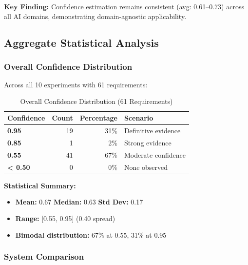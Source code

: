 \documentclass[11pt,a4paper]{article}
\begin{document}
\textbf{Key Finding:} Confidence estimation remains consistent (avg: 0.61--0.73) across all AI domains, demonstrating domain-agnostic applicability.

\subsection{Aggregate Statistical Analysis}

\subsubsection{Overall Confidence Distribution}

Across all 10 experiments with 61 requirements:

\begin{table}[H]
\centering
\caption{Overall Confidence Distribution (61 Requirements)}
\begin{tabular}{lrrl}
\toprule
\textbf{Confidence} & \textbf{Count} & \textbf{Percentage} & \textbf{Scenario} \\
\midrule
\textbf{0.95} & 19 & 31\% & Definitive evidence \\
\textbf{0.85} & 1 & 2\% & Strong evidence \\
\textbf{0.55} & 41 & 67\% & Moderate confidence \\
\textbf{< 0.50} & 0 & 0\% & None observed \\
\bottomrule
\end{tabular}
\label{tab:overall-distribution-new}
\end{table}

\textbf{Statistical Summary:}
\begin{itemize}[leftmargin=*]
    \item \textbf{Mean:} 0.67 \quad \textbf{Median:} 0.63 \quad \textbf{Std Dev:} 0.17
    \item \textbf{Range:} [0.55, 0.95] (0.40 spread)
    \item \textbf{Bimodal distribution:} 67\% at 0.55, 31\% at 0.95
\end{itemize}

\subsubsection{System Comparison}
\end{document}
